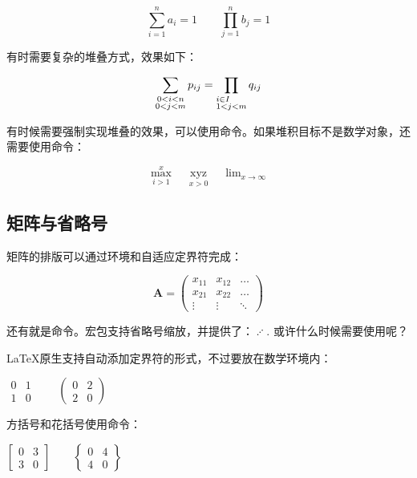 \begin{codeshow}
\[\sum_{i=1}^{n}a_i=1 \qquad
\prod_{j=1}^{n}b_j=1\]
\end{codeshow}

有时需要复杂的堆叠方式，效果如下：

\begin{codeshow}
\[\sum_{\substack{0<i<n \\
  0<j<m}} p_{ij}=
  \prod_{\begin{subarray}{l}
  i\in I \\  1<j<m
  \end{subarray}}q_{ij}\]
\end{codeshow}

有时候需要强制实现堆叠的效果，可以使用命令。如果堆积目标不是数学对象，还需要使用命令：

\begin{codeshow}
\[\max\limits_{i>1}^{x}\quad
\mathop{xyz}\limits_{x>0}\quad
\lim\nolimits_{x\to \infty}\]
\end{codeshow}

\subsection{矩阵与省略号}
矩阵的排版可以通过环境和自适应定界符完成：

\begin{codeshow}
\[\mathbf{A}=
\left(\begin{array}{ccc}
x_{11} & x_{12} & \ldots \\
x_{21} & x_{22} & \ldots \\
\vdots & \vdots & \ddots
\end{array}\right)\]
\end{codeshow}

还有就是命令。宏包支持省略号缩放，并提供了：$\iddots$. 或许什么时候需要使用呢？

\LaTeX 原生支持自动添加定界符的形式，不过要放在数学环境内：
\begin{codeshow}
\centering $\begin{matrix}
0 & 1 \\ 1 & 0 \end{matrix}\qquad
\begin{pmatrix} 0 & 2 \\
2 & 0 \end{pmatrix}$
\end{codeshow}

方括号和花括号使用命令：
\begin{codeshow}
\centering $\begin{bmatrix}
0 & 3 \\ 3 & 0 \end{bmatrix}\qquad
\begin{Bmatrix} 0 & 4 \\
4 & 0 \end{Bmatrix}$
\end{codeshow}

